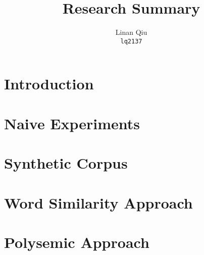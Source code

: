 \documentclass[11pt]{scrartcl}
\title{Research Summary}
\author{Linan Qiu\\\texttt{lq2137}}
\begin{document}
\maketitle

\begin{abstract}

\end{abstract}

\newpage

\tableofcontents

\newpage

\section{Introduction}



\section{Naive Experiments}



\section{Synthetic Corpus}



\section{Word Similarity Approach}



\section{Polysemic Approach}



\begin{appendices}

\end{appendices}



\end{document}
